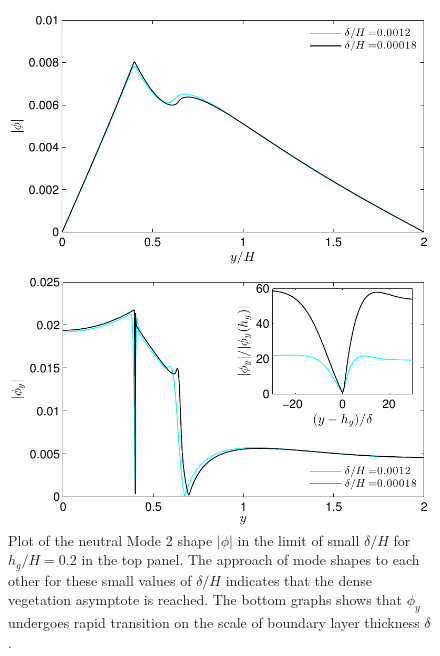 \documentclass[12pt]{report}   %
\newcommand{\hg}{h_g}
\begin{document}
\begin{figure}
\centerline{\includegraphics[width=1\linewidth]{AsymptoticPhiNoshear}}
\centerline{\includegraphics[width=0.95\linewidth]{AsymptoticPhiyNoshear}}
\caption[Plot of the neutral Mode 2 shape $|\phi|$ in the limit of small $\delta/H$ for $\hg/H=0.2$]{
Plot of the neutral Mode 2 shape $|\phi|$ in the limit of small $\delta/H$ for $\hg/H=0.2$ in the top panel.
The approach of mode shapes to each other for these small values of $\delta/H$ indicates that the dense vegetation asymptote is reached. 
The bottom graphs shows that $\phi_y$ undergoes rapid transition on the scale of boundary layer thickness $\delta$.
}
\label{Asymptotic_mode2}
\end{figure}
\end{document}
